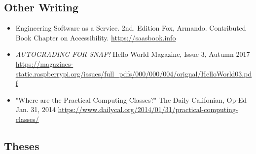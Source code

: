 \vspace{6pt}

\subsection{Other Writing}

\vspace{5pt}

\begin{itemize}

    \setlength\itemsep{1em}
    
    \item Engineering Software as a Service. 2nd. Edition Fox, Armando. Contributed Book Chapter on Accessibility.
    \newline
    \href{https://saasbook.info}{https://saasbook.info}

    \item{\textit{AUTOGRADING FOR SNAP!} Hello World Magazine, Issue 3, Autumn 2017}
    \newline
    \small{\href{https://magazines-static.raspberrypi.org/issues/full\_pdfs/000/000/004/orignal/HelloWorld03.pdf}{https://magazines-static.raspberrypi.org/issues/full\_pdfs/000/000/004/orignal/HelloWorld03.pdf}}
    
    \item{"Where are the Practical Computing Classes?" The Daily Califonian, Op-Ed Jan. 31, 2014
    \newline
    \href{https://www.dailycal.org/2014/01/31/practical-computing-classes/}{https://www.dailycal.org/2014/01/31/practical-computing-classes/}}

\end{itemize}


\subsection{Theses}

\vspace{5pt}

